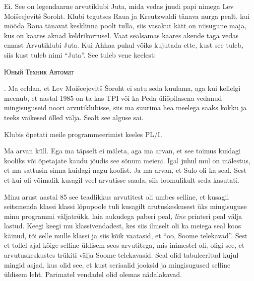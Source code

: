 
Ei. See on legendaarne arvutiklubi Juta, mida vedas juudi papi nimega Lev Moišeejevitš Šoroht. Klubi tegutses Raua ja  Kreutzwaldi tänava nurga pealt, kui mööda Raua tänavat  kesklinna poolt tulla, siis vasakut kätt on niisugune maja, kus on  kaares aknad keldrikorrusel. Vaat sealsamas kaares akende taga vedas ennast Arvutiklubi Juta. Kui Ahhaa puhul võiks kujutada ette, kust see tuleb, siis kust tuleb nimi \enquote{Juta}. See tuleb vene keelest: \begin{russian}Юный Техник Автомат\end{russian}. Ma eeldan, et Lev Moišeejevitš Šoroht ei satu seda  kuulama, aga kui  kellelgi meenub, et aastal 1985  on ta kas TPI või ka Peda üliõpilasena vedanud mingisuguseid noori arvutiklubisse, siis ma suurima hea meelega saaks kokku ja teeks väikesed õlled välja. Sealt see alguse sai. 

Klubis õpetati meile programmeerimist keeles PL/I.


Ma arvan küll. Ega ma täpselt ei mäleta, aga ma arvan, et see toimus kuidagi kooliks või õpetajate kaudu jõudis see sõnum meieni. Igal juhul mul on mälestus, et ma sattusin sinna kuidagi nagu koolist. Ja ma arvan, et Sulo oli ka seal. Sest et kui oli võimalik kusagil veel arvutisse saada, siis loomulikult seda kasutati.


Minu arust aastal 85  see teadlikkus arvutitest oli umbes selline, et kusagil seitsmenda klassi klassi lõpupoole tuli kusagilt arutuskeskusest üks mingisuguse minu programmi väljatrükk, laia aukudega paberi peal, \emph{line} printeri peal välja lastud. Keegi keegi mu klassivendadest, kes siis ilmselt oli ka meiega seal koos käinud, tõi selle mulle klassi ja siis kõik vaatasid, et \enquote{oo, Soome telekavad}. Sest et tollel ajal kõige selline üldisem seos arvutitega, mis inimestel oli, oligi see, et arvutuskeskustes trükiti välja Soome telekavasid. Seal olid tabuleeritud kujul mingid asjad, kus olid see, et kust seriaalid jooksid ja mingisugused selline üldisem leht. Parimatel vendadel olid olemas nädalakavad. 


